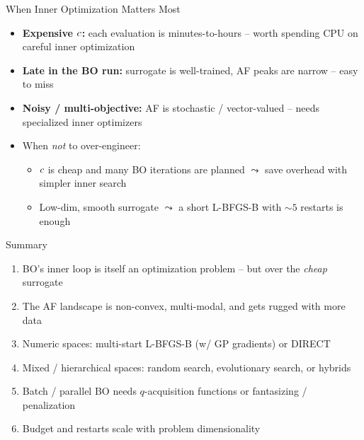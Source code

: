 \documentclass[main]{subfiles}
\begin{document}
\begin{frame}[t]{When Inner Optimization Matters Most}
  \begin{itemize}
    \item \textbf{Expensive $c$:} each evaluation is minutes-to-hours -- worth spending CPU on careful inner optimization
    \item \textbf{Late in the BO run:} surrogate is well-trained, AF peaks are narrow -- easy to miss
    \item \textbf{Noisy / multi-objective:} AF is stochastic / vector-valued -- needs specialized inner optimizers
  \end{itemize}
  \vspace{0.2cm}
  \begin{itemize}
    \item When \emph{not} to over-engineer:
        \begin{itemize}
            \item $c$ is cheap and many BO iterations are planned $\leadsto$ save overhead with simpler inner search
            \item Low-dim, smooth surrogate $\leadsto$ a short L-BFGS-B with $\sim\!5$ restarts is enough
        \end{itemize}
  \end{itemize}
\end{frame}


\begin{frame}[t]{Summary}
  \begin{enumerate}
    \item BO's inner loop is itself an optimization problem -- but over the \emph{cheap} surrogate
    \item The AF landscape is non-convex, multi-modal, and gets rugged with more data
    \item Numeric spaces: multi-start L-BFGS-B (w/ GP gradients) or DIRECT
    \item Mixed / hierarchical spaces: random search, evolutionary search, or hybrids
    \item Batch / parallel BO needs $q$-acquisition functions or fantasizing / penalization
    \item Budget and restarts scale with problem dimensionality
  \end{enumerate}
\end{frame}
\end{document}
